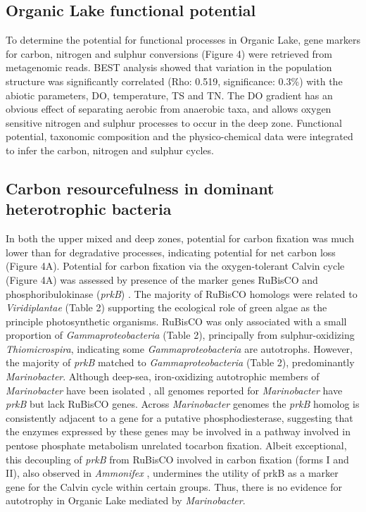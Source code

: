 {{\subsection{Organic Lake functional potential}
To determine the potential for functional processes in Organic Lake, gene markers for carbon, nitrogen and sulphur conversions (Figure 4) were retrieved from metagenomic reads. 
BEST analysis showed that variation in the population structure was significantly correlated (Rho: 0.519, significance: 0.3\%) with the abiotic parameters, \ac{DO}, temperature, \ac{TS} and \ac{TN}. 
The \ac{DO} gradient has an obvious effect of separating aerobic from anaerobic taxa, and allows oxygen sensitive nitrogen and sulphur processes to occur in the deep zone. 
Functional potential, taxonomic composition and the physico-chemical data were integrated to infer the carbon, nitrogen and sulphur cycles.

\subsection{Carbon resourcefulness in dominant heterotrophic bacteria}
In both the upper mixed and deep zones, potential for carbon fixation was much lower than for degradative processes, indicating potential for net carbon loss (Figure 4A). 
Potential for carbon fixation via the oxygen-tolerant Calvin cycle (Figure 4A) was assessed by presence of the marker genes \ac{RuBisCO} and phosphoribulokinase (\emph{prkB}) \cite{Hugler2011}. 
The majority of \ac{RuBisCO} homologs were related to \emph{Viridiplantae} (Table 2) supporting the ecological role of green algae as the principle photosynthetic organisms. 
\ac{RuBisCO} was only associated with a small proportion of \emph{Gammaproteobacteria} (Table 2), principally from sulphur-oxidizing \emph{Thiomicrospira}, indicating some \emph{Gammaproteobacteria} are autotrophs. 
However, the majority of \emph{prkB} matched to \emph{Gammaproteobacteria} (Table 2), predominantly \emph{Marinobacter}. 
Although deep-sea, iron-oxidizing autotrophic members of \emph{Marinobacter} have been isolated \cite{Edwards2003}, all genomes reported for \emph{Marinobacter} have \emph{prkB} but lack \ac{RuBisCO} genes. 
Across \emph{Marinobacter} genomes the \emph{prkB} homolog is consistently adjacent to a gene for a putative phosphodiesterase, suggesting that the enzymes expressed by these genes may be involved in a pathway involved in pentose phosphate metabolism unrelated tocarbon fixation. 
Albeit exceptional, this decoupling of \emph{prkB} from \ac{RuBisCO} involved in carbon fixation (forms I and II), also observed in \emph{Ammonifex} \cite{Hugler2011}, undermines the utility of prkB as a marker gene for the Calvin cycle within certain groups. 
Thus, there is no evidence for autotrophy in Organic Lake mediated by \emph{Marinobacter}.

}}
